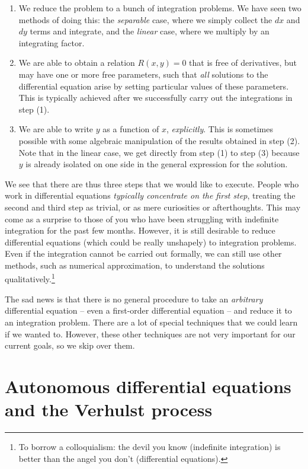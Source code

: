 \documentclass{amsart}
\begin{document}
\begin{enumerate}
\item We reduce the problem to a bunch of integration problems. We
  have seen two methods of doing this: the {\em separable} case, where
  we simply collect the $dx$ and $dy$ terms and integrate, and the
  {\em linear} case, where we multiply by an integrating factor.
\item We are able to obtain a relation $R(x,y) = 0$ that is free of
  derivatives, but may have one or more free parameters, such that
  {\em all} solutions to the differential equation arise by setting
  particular values of these parameters. This is typically achieved
  after we successfully carry out the integrations in step (1).
\item We are able to write $y$ as a function of $x$, {\em
  explicitly}. This is sometimes possible with some algebraic
  manipulation of the results obtained in step (2). Note that in the
  linear case, we get directly from step (1) to step (3) because $y$
  is already isolated on one side in the general expression for the
  solution.
\end{enumerate}

We see that there are thus three steps that we would like to
execute. People who work in differential equations {\em typically
concentrate on the first step}, treating the second and third step as
trivial, or as mere curiosities or afterthoughts. This may come as a
surprise to those of you who have been struggling with indefinite
integration for the past few months. However, it is still desirable to
reduce differential equations (which could be really unshapely) to
integration problems. Even if the integration cannot be carried out
formally, we can still use other methods, such as numerical
approximation, to understand the solutions qualitatively.\footnote{To
borrow a colloquialism: the devil you know (indefinite integration) is
better than the angel you don't (differential equations).}

The sad news is that there is no general procedure to take an {\em
arbitrary} differential equation -- even a first-order differential
equation -- and reduce it to an integration problem. There are a lot
of special techniques that we could learn if we wanted to. However,
these other techniques are not very important for our current goals,
so we skip over them.

\section{Autonomous differential equations and the Verhulst process}
\end{document}
